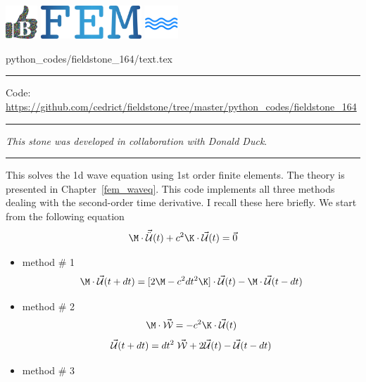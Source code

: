 \noindent
\includegraphics[height=1.25cm]{images/pictograms/benchmark}
\includegraphics[height=1.25cm]{images/pictograms/FEM}
\includegraphics[height=1.25cm]{images/pictograms/wave}


\begin{flushright} {\tiny {\color{gray} python\_codes/fieldstone\_164/text.tex}} \end{flushright}

%

\par\noindent\rule{\textwidth}{0.4pt}

\begin{center}
\inpython
{\small Code: \url{https://github.com/cedrict/fieldstone/tree/master/python_codes/fieldstone_164}}
\end{center}

\par\noindent\rule{\textwidth}{0.4pt}

{\sl This stone was developed in collaboration with Donald Duck}. 

\par\noindent\rule{\textwidth}{0.4pt}


This \stone solves the 1d wave equation using 1st order finite elements. 
The theory is presented in Chapter~\ref{fem_waveq}. 
This code implements all three methods dealing with the second-order time derivative. 
I recall these here briefly.
We start from the following equation
\[
\M \cdot \vec{\ddot{{\cal U}}}(t) + c^2 \K \cdot \vec{\cal U}(t) = \vec{0}
\]

\begin{itemize}
\item method \# 1
\[
\M \cdot  \vec{\cal U}(t+dt)
= [2  \M  - c^2 dt^2 \K  ]  \cdot \vec{\cal U}(t) - \M \cdot \vec{\cal U}(t-dt)
\]

\item method \# 2 
\[
\M \cdot \vec{\cal W}= -c^2 \K \cdot \vec{\cal U}(t)
\]
\[
\vec{\cal U}(t+dt) = dt^2 \; \vec{\cal W} +2 \vec{\cal U}(t) - \vec{\cal U}(t-dt)
\]

\item method \# 3 
\end{itemize}

